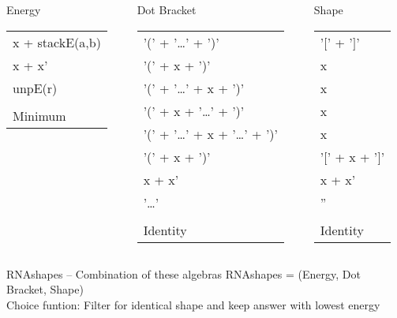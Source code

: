 \documentclass[ignorenonframetext,10pt]{beamer}
\begin{document}
{\begin{columns}
\begin{column}{.33\textwidth}
\begin{block}{\small Energy}
\begin{tabular}{l}
          x + stackE(a,b)\\
          x + x'\\
          unpE(r)\\
          \hline
          \phantom{x}\\
          Minimum
        \end{tabular}
      \end{block}
    \end{column}
    \begin{column}{.31\textwidth}
      \begin{block}{\small Dot Bracket}
        \begin{tabular}{l}
          '('  +  '\ldots'  +  ')' \\
          '('  + x +  ')' \\
          '('  +  '\ldots'  + x +  ')' \\
          '('  + x +  '\ldots'  +  ')' \\
          '('  +  '\ldots'  + x +  '\ldots'  +  ')' \\
          '('  + x +  ')' \\
          x + x'\\
          '\ldots' \\
          \hline
          \phantom{x}\\
          Identity
        \end{tabular}
      \end{block}
    \end{column}
    \begin{column}{.16\textwidth}
      \begin{block}{\small Shape}
        \begin{tabular}{l}
          '$[$'  +  '$]$' \\
          x\\
          x\\
          x\\
          x\\
          '$[$'  + x +  '$]$' \\
          x + x'\\
          ''\\
          \hline
          \phantom{x}\\
          Identity
        \end{tabular}
      \end{block}
    \end{column}
  \end{columns}
  \small
  \begin{block}{RNAshapes -- Combination of these algebras}
    RNAshapes = (Energy, Dot Bracket, Shape)\\
    Choice funtion: Filter for identical shape and keep answer with lowest energy
  \end{block}
}
\end{document}
